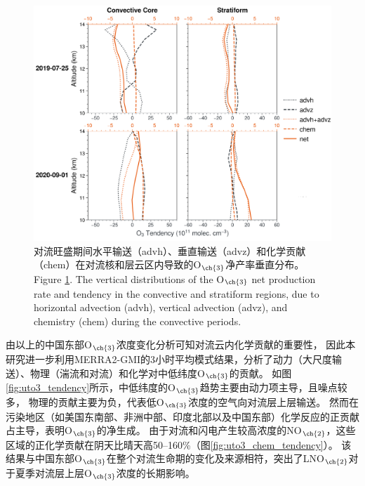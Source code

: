 \begin{figure}[H]
\centering
\includegraphics[width=\textwidth]{./figures/tendency_o3_classification.png}
\caption{
对流旺盛期间水平输送（advh）、垂直输送（advz）和化学贡献（chem）在对流核和层云区内导致的O$_{\ch{3}}$净产率垂直分布。
\\
Figure \ref{fig:tendency_o3_classification}. The vertical distributions of the O$_{\ch{3}}$ net production rate and tendency in the convective and stratiform regions, due to horizontal advection (advh), vertical advection (advz), and chemistry (chem) during the convective periods.
}
\label{fig:tendency_o3_classification}
\end{figure}

由以上的中国东部O$_{\ch{3}}$浓度变化分析可知对流云内化学贡献的重要性，
因此本研究进一步利用MERRA2-GMI的3小时平均模式结果，分析了动力（大尺度输送）、物理（湍流和对流）和化学对中低纬度O$_{\ch{3}}$的贡献。
如图\ref{fig:uto3_tendency}所示，中低纬度的O$_{\ch{3}}$趋势主要由动力项主导，且噪点较多，
物理的贡献主要为负，代表低O$_{\ch{3}}$浓度的空气向对流层上层输送。
然而在污染地区（如美国东南部、非洲中部、印度北部以及中国东部）化学反应的正贡献占主导，表明O$_{\ch{3}}$的净生成。
由于对流和闪电产生较高浓度的NO$_{\ch{2}}$，这些区域的正化学贡献在阴天比晴天高50--160\%（图\ref{fig:uto3_chem_tendency}）。
该结果与中国东部O$_{\ch{3}}$在整个对流生命期的变化及来源相符，突出了LNO$_{\ch{2}}$对于夏季对流层上层O$_{\ch{3}}$浓度的长期影响。


